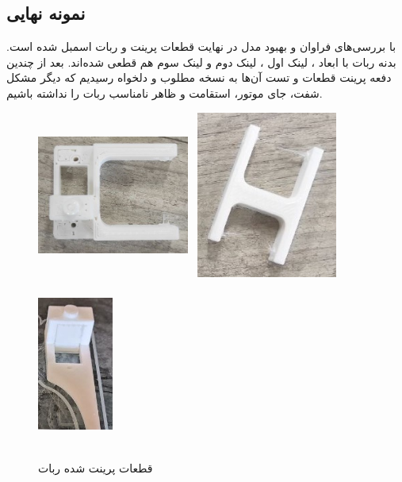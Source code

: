 \subsection{نمونه نهایی}
با بررسی‌های فراوان و بهبود مدل در نهایت قطعات پرینت و ربات اسمبل شده است. بدنه ربات با ابعاد ، لینک اول ، لینک دوم  و لینک سوم هم  قطعی شده‌اند. بعد از چندین دفعه پرینت قطعات و تست آن‌ها به نسخه مطلوب و دلخواه رسیدیم که دیگر مشکل شفت، جای موتور، استقامت و ظاهر نامناسب ربات را نداشته باشیم.

	\begin{figure}[!h]	
	\vspace{0.2cm}
	\centering
	\includegraphics[height=5.5cm,width=5cm]{./Images/CH2/Link1_Printed.jpeg}
	\includegraphics[height=5.5cm,width=5cm]{./Images/CH2/Link2_Printed.jpeg}
	\includegraphics[height=5.5cm,width=2.5cm]{./Images/CH2/Link3_Printed.jpeg}
	\caption{قطعات پرینت شده ربات}
	\label{قطعات پرینت شده ربات}
	\end{figure}
	
